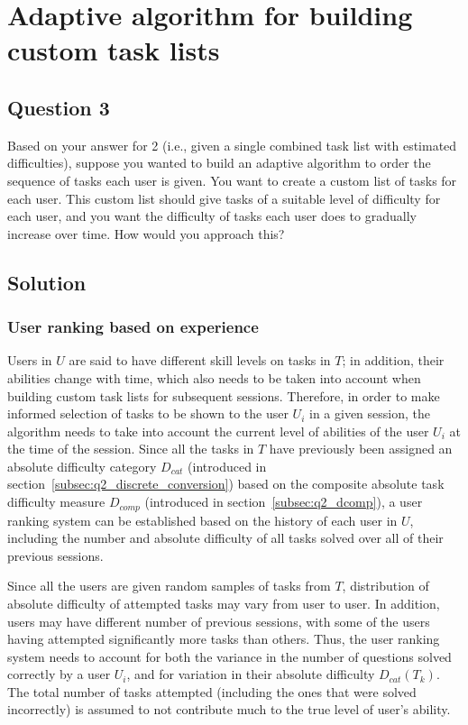 \chapter{Adaptive algorithm for building custom task lists} \label{ch:q3_adaptive_algorithm}

\section{Question 3} \label{sec:q3}

Based on your answer for 2 (i.e., given a single combined task list with estimated difficulties), suppose you wanted to build an adaptive algorithm to order the sequence of tasks each user is given.
You want to create a custom list of tasks for each user.
This custom list should give tasks of a suitable level of difficulty for each user, and you want the difficulty of tasks each user does to gradually increase over time.
How would you approach this?

\section{Solution} \label{sec:q3_solution}

\subsection{User ranking based on experience} \label{subsec:q3_user_stratification}

Users in $U$ are said to have different skill levels on tasks in $T$;
in addition, their abilities change with time, which also needs to be taken into account when building custom task lists for subsequent sessions.
Therefore, in order to make informed selection of tasks to be shown to the user $U_i$ in a given session, the algorithm needs to take into account the current level of abilities of the user $U_i$ at the time of the session.
Since all the tasks in $T$ have previously been assigned an absolute difficulty category $D_{cat}$ (introduced in section~\ref{subsec:q2_discrete_conversion}) based on the composite absolute task difficulty measure $D_{comp}$ (introduced in section~\ref{subsec:q2_dcomp}), a user ranking system can be established based on the history of each user in $U$, including the number and absolute difficulty of all tasks solved over all of their previous sessions.

Since all the users are given random samples of tasks from $T$, distribution of absolute difficulty of attempted tasks may vary from user to user.
In addition, users may have different number of previous sessions, with some of the users having attempted significantly more tasks than others.
Thus, the user ranking system needs to account for both the variance in the number of questions solved correctly by a user $U_i$, and for variation in their absolute difficulty $D_{cat}(T_k)$.
The total number of tasks attempted (including the ones that were solved incorrectly) is assumed to not contribute much to the true level of user's ability.

